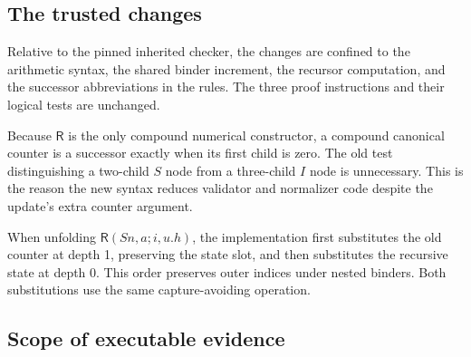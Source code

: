 \documentclass[11pt]{article}
\theoremstyle{definition}
\theoremstyle{remark}
\newcommand{\R}{\mathsf R}
\begin{document}
\subsection{The trusted changes}

Relative to the pinned inherited checker,
the changes are confined to the arithmetic
syntax, the shared binder increment,
the recursor computation, and the
successor abbreviations in the rules.
The three proof instructions and their
logical tests are unchanged.

Because $\R$ is the only compound
numerical constructor, a compound
canonical counter is a successor
exactly when its first child is zero.
The old test distinguishing a two-child
$S$ node from a three-child $I$ node
is unnecessary. This is the reason
the new syntax reduces validator and
normalizer code despite the update's
extra counter argument.

When unfolding $\R(Sn,a;i,u.h)$,
the implementation first substitutes
the old counter at depth 1, preserving
the state slot, and then substitutes
the recursive state at depth 0.
This order preserves outer indices
under nested binders. Both substitutions
use the same capture-avoiding operation.

\subsection{Scope of executable evidence}
\end{document}
